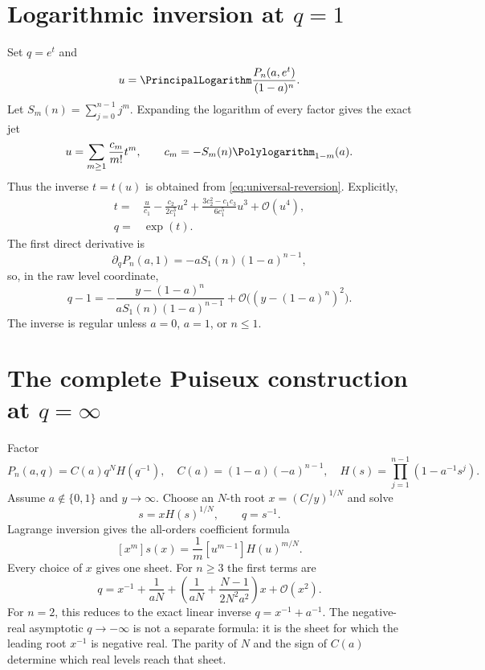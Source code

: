\documentclass[11pt,oneside]{book}
\theoremstyle{definition}
\theoremstyle{remark}
\newcommand{\OO}{\mathcal{O}}
\begin{document}
\section{Logarithmic inversion at $q=1$}
Set $q=e^t$ and
\[
 u=\PrincipalLogarithm\frac{P_n(a,e^t)}{(1-a)^n}.
\]
Let $S_m(n)=\sum_{j=0}^{n-1}j^m$.  Expanding the logarithm of every factor
gives the exact jet
\begin{equation}\label{eq:finite-cumulants-qone}
 u=\sum_{m\ge1}\frac{c_m}{m!}t^m,
 \qquad c_m=-S_m(n)\Polylogarithm_{1-m}(a).
\end{equation}
Thus the inverse $t=t(u)$ is obtained from
\eqref{eq:universal-reversion}.  Explicitly,
\begin{align}
 t={}&\frac{u}{c_1}-\frac{c_2}{2c_1^3}u^2
 +\frac{3c_2^2-c_1c_3}{6c_1^5}u^3+\OO(u^4),
 \label{eq:finite-qone-inverse-t}\\
 q={}&\exp(t).
\end{align}
The first direct derivative is
\[
 \partial_qP_n(a,1)=-aS_1(n)(1-a)^{n-1},
\]
so, in the raw level coordinate,
\begin{equation}\label{eq:finite-qone-linear}
 q-1=-\frac{y-(1-a)^n}{aS_1(n)(1-a)^{n-1}}
 +\OO\bigl((y-(1-a)^n)^2\bigr).
\end{equation}
The inverse is regular unless $a=0$, $a=1$, or $n\le1$.

\section{The complete Puiseux construction at $q=\infty$}
Factor
\begin{equation}\label{eq:finite-q-infty-factor}
 P_n(a,q)=C(a)q^NH(q^{-1}),
\quad C(a)=(1-a)(-a)^{n-1},
\quad H(s)=\prod_{j=1}^{n-1}(1-a^{-1}s^j).
\end{equation}
Assume $a\notin\{0,1\}$ and $y\to\infty$.  Choose an $N$-th root
$x=(C/y)^{1/N}$ and solve
\begin{equation}\label{eq:s-lagrange-infty}
 s=xH(s)^{1/N},\qquad q=s^{-1}.
\end{equation}
Lagrange inversion gives the all-orders coefficient formula
\begin{equation}\label{eq:s-coeff-infty}
 [x^m]s(x)=\frac1m[u^{m-1}]H(u)^{m/N}.
\end{equation}
Every choice of $x$ gives one sheet.  For $n\ge3$ the first terms are
\begin{equation}\label{eq:q-infty-finite-first}
 q=x^{-1}+\frac1{aN}
 +\left(\frac1{aN}+\frac{N-1}{2N^2a^2}\right)x+\OO(x^2).
\end{equation}
For $n=2$, this reduces to the exact linear inverse
$q=x^{-1}+a^{-1}$.  The negative-real asymptotic $q\to-\infty$ is not a
separate formula: it is the sheet for which the leading root $x^{-1}$ is
negative real.  The parity of $N$ and the sign of $C(a)$ determine which real
levels reach that sheet.
\end{document}
